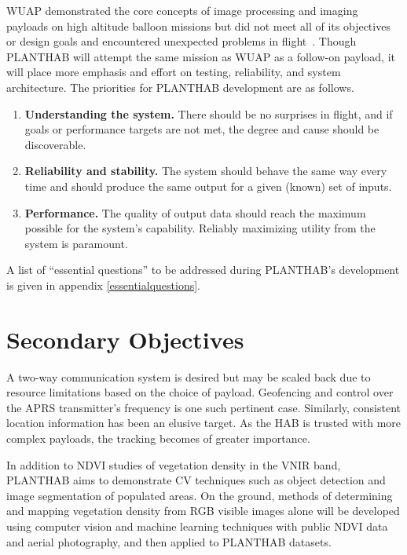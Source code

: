 \documentclass[conference]{IEEEtran} %
\begin{document}
WUAP demonstrated the core concepts of image processing and imaging payloads on high altitude balloon missions but did not meet all of its objectives or design goals and encountered unexpected problems in flight~\cite[Post-Flight Analysis]{wuaphab4}.
Though PLANTHAB will attempt the same mission as WUAP as a follow-on payload, it will place more emphasis and effort on testing, reliability, and system architecture.
The priorities for PLANTHAB development are as follows.
\begin{enumerate}\small
    \item \textbf{Understanding the system.} There should be no surprises in flight, and if goals or performance targets are not met, the degree and cause should be discoverable.
    \item \textbf{Reliability and stability.} The system should behave the same way every time and should produce the same output for a given (known) set of inputs.
    \item \textbf{Performance.} The quality of output data should reach the maximum possible for the system's capability. Reliably maximizing utility from the system is paramount.
\end{enumerate}

A list of ``essential questions'' to be addressed during PLANTHAB's development is given in appendix \ref{essentialquestions}.


\section{Secondary Objectives}
\label{secondaryobjectives}
A two-way communication system is desired but may be scaled back due to resource limitations based on the choice of payload. Geofencing and control over the APRS transmitter's frequency is one such pertinent case.
Similarly, consistent location information has been an elusive target.
As the HAB is trusted with more complex payloads, the tracking becomes of greater importance.

In addition to NDVI studies of vegetation density in the VNIR band, PLANTHAB aims to demonstrate CV techniques such as object detection and image segmentation of populated areas.
On the ground, methods of determining and mapping vegetation density from RGB visible images alone will be developed using computer vision and machine learning techniques with public NDVI data and aerial photography, and then applied to PLANTHAB datasets.
\end{document}

